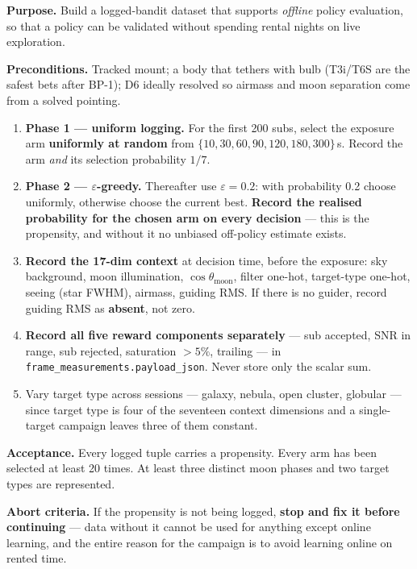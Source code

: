 \documentclass[11pt]{article}
\newcommand{\co}[1]{\texttt{\small #1}}
\begin{document}
\textbf{Purpose.} Build a logged-bandit dataset that supports \emph{offline}
policy evaluation, so that a policy can be validated without spending rental
nights on live exploration.

\textbf{Preconditions.} Tracked mount; a body that tethers with bulb (T3i/T6S
are the safest bets after BP-1); D6 ideally resolved so airmass and moon
separation come from a solved pointing.

\begin{enumerate}
\item \textbf{Phase 1 --- uniform logging.} For the first 200 subs, select the
      exposure arm \textbf{uniformly at random} from
      $\{10, 30, 60, 90, 120, 180, 300\}$\,s. Record the arm \emph{and} its
      selection probability $1/7$.
\item \textbf{Phase 2 --- $\varepsilon$-greedy.} Thereafter use
      $\varepsilon = 0.2$: with probability 0.2 choose uniformly, otherwise
      choose the current best. \textbf{Record the realised probability for the
      chosen arm on every decision} --- this is the propensity, and without it
      no unbiased off-policy estimate exists.
\item \textbf{Record the 17-dim context} at decision time, before the exposure:
      sky background, moon illumination, $\cos\theta_{\mathrm{moon}}$, filter
      one-hot, target-type one-hot, seeing (star FWHM), airmass, guiding RMS.
      If there is no guider, record guiding RMS as \textbf{absent}, not zero.
\item \textbf{Record all five reward components separately} ---
      sub accepted, SNR in range, sub rejected, saturation $>5\%$, trailing ---
      in \co{frame\_measurements.payload\_json}. Never store only the scalar
      sum.
\item Vary target type across sessions --- galaxy, nebula, open cluster,
      globular --- since target type is four of the seventeen context
      dimensions and a single-target campaign leaves three of them constant.
\end{enumerate}

\textbf{Acceptance.} Every logged tuple carries a propensity. Every arm has
been selected at least 20 times. At least three distinct moon phases and two
target types are represented.

\textbf{Abort criteria.} If the propensity is not being logged, \textbf{stop and
fix it before continuing} --- data without it cannot be used for anything except
online learning, and the entire reason for the campaign is to avoid learning
online on rented time.
\end{document}
